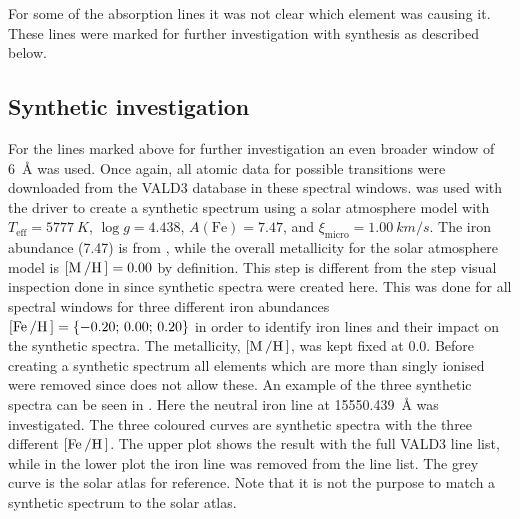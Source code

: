For some of the absorption lines it was not clear which element was causing it. These lines were
marked for further investigation with synthesis as described below.

\subsection{Synthetic investigation}

For the lines marked above for further investigation an even broader window of \SI{6}{\angstrom} was
used. Once again, all atomic data for possible transitions were downloaded from the VALD3 database
in these spectral windows.  was used with the  driver to create a synthetic
spectrum using a solar atmosphere model with $T_\mathrm{eff}=\SI{5777}{K}$, $\log g=4.438$,
$A(\mathrm{Fe})=7.47$, and $\xi_\mathrm{micro}=\SI{1.00}{km/s}$. The iron abundance (7.47) is from
\citet{Gonzalez2000}, while the overall metallicity for the solar atmosphere model is
$[\ion{M}/\ion{H}]=0.00$ by definition. This step is different from the step visual inspection done
in  since synthetic spectra were created here. This was done for all spectral
windows for three different iron abundances $[\ion{Fe}/\ion{H}]=\{-0.20;\,0.00;\,0.20\}$ in order to
identify iron lines and their impact on the synthetic spectra. The metallicity, $[\ion{M}/\ion{H}]$,
was kept fixed at 0.0. Before creating a synthetic spectrum all elements which are more than singly
ionised were removed since  does not allow these. An example of the three synthetic
spectra can be seen in . Here the neutral iron line at
\SI{15550.439}{\angstrom} was investigated. The three coloured curves are synthetic spectra with the
three different $[\ion{Fe}/\ion{H}]$. The upper plot shows the result with the full VALD3 line list,
while in the lower plot the iron line was removed from the line list. The grey curve is the solar
atlas for reference. Note that it is not the purpose to match a synthetic spectrum to the solar
atlas.

